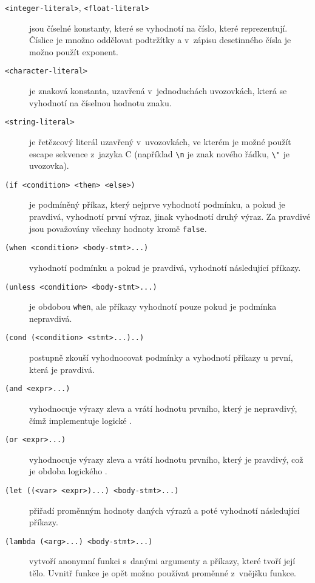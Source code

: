 \begin{description}
  \item[\texttt{<integer-literal>}, \texttt{<float-literal>}] jsou číselné
    konstanty, které se vyhodnotí na číslo, které reprezentují. Číslice je
    množno oddělovat podtržítky a v~zápisu desetinného čísla je možno použít
    exponent.

  \item[\texttt{<character-literal>}] je znaková konstanta, uzavřená
    v~jednoduchách uvozovkách, která se vyhodnotí na číselnou hodnotu znaku.

  \item[\texttt{<string-literal>}] je řetězcový literál uzavřený v~uvozovkách,
    ve kterém je možné použít escape sekvence z~jazyka C (například
    \texttt{\textbackslash{}n} je znak nového řádku, \texttt{\textbackslash{}"}
    je uvozovka).

  \item[\texttt{(if <condition> <then> <else>)}] je podmíněný příkaz, který
    nejprve vyhodnotí podmínku, a pokud je pravdivá, vyhodnotí první výraz,
    jinak vyhodnotí druhý výraz. Za pravdivé jsou považovány všechny hodnoty
    kromě \texttt{false}.

  \item[\texttt{(when <condition> <body-stmt>...)}] vyhodnotí podmínku a pokud
    je pravdivá, vyhodnotí následující příkazy. 

  \item[\texttt{(unless <condition> <body-stmt>...)}] je obdobou \texttt{when},
    ale příkazy vyhodnotí pouze pokud je podmínka nepravdivá.

  \item[\texttt{(cond (<condition> <stmt>...)..)}] postupně zkouší vyhodnocovat
    podmínky a vyhodnotí příkazy u první, která je pravdivá.

  \item[\texttt{(and <expr>...)}] vyhodnocuje výrazy zleva a vrátí hodnotu
    prvního, který je nepravdivý, čímž implementuje logické .

  \item[\texttt{(or <expr>...)}] vyhodnocuje výrazy zleva a vrátí hodnotu
    prvního, který je pravdivý, což je obdoba logického .

  \item[\texttt{(let ((<var> <expr>)...) <body-stmt>...)}] přiřadí proměnným
    hodnoty daných výrazů a poté vyhodnotí následující příkazy.

  \item[\texttt{(lambda (<arg>...) <body-stmt>...)}] vytvoří anonymní funkci
    s~danými argumenty a příkazy, které tvoří její tělo. Uvnitř funkce je opět
    možno používat proměnné z~vnějšku funkce.


\end{description}
